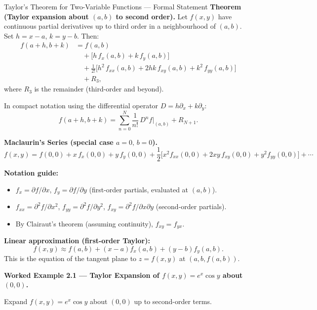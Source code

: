 \documentclass[12pt,a4paper]{article}
\begin{document}
\begin{infobox}{Taylor's Theorem for Two-Variable Functions --- Formal Statement}
\textbf{Theorem (Taylor expansion about \( (a,b) \) to second order).}
Let \( f(x,y) \) have continuous partial derivatives up to third order in a neighbourhood of \( (a,b) \). Set \( h = x-a \), \( k = y-b \). Then:
\begin{align*}
  f(a+h, b+k) &= f(a,b) \\
  &\quad + \bigl[h\,f_{x}(a,b) + k\,f_{y}(a,b)\bigr] \\
  &\quad + \frac{1}{2!}\bigl[h^{2}\,f_{xx}(a,b) + 2hk\,f_{xy}(a,b) + k^{2}\,f_{yy}(a,b)\bigr] \\
  &\quad + R_{3},
\end{align*}
where \( R_{3} \) is the remainder (third-order and beyond).

In compact notation using the differential operator \( D = h\partial_{x} + k\partial_{y} \):
\[
  f(a+h, b+k) = \sum_{n=0}^{N} \frac{1}{n!}\,D^{n}f\Big|_{(a,b)} + R_{N+1}.
\]

\textbf{Maclaurin's Series (special case \( a = 0,\, b = 0 \)).}
\[
  f(x,y) = f(0,0) + x\,f_{x}(0,0) + y\,f_{y}(0,0)
            + \frac{1}{2}\bigl[x^{2}f_{xx}(0,0) + 2xy\,f_{xy}(0,0) + y^{2}f_{yy}(0,0)\bigr] + \cdots
\]

\textbf{Notation guide:}
\begin{itemize}[leftmargin=*]
  \item \( f_{x} = \partial f/\partial x \), \( f_{y} = \partial f/\partial y \) (first-order partials, evaluated at \( (a,b) \)).
  \item \( f_{xx} = \partial^{2}f/\partial x^{2} \), \( f_{yy} = \partial^{2}f/\partial y^{2} \), \( f_{xy} = \partial^{2}f/\partial x\partial y \) (second-order partials).
  \item By Clairaut's theorem (assuming continuity), \( f_{xy} = f_{yx} \).
\end{itemize}

\textbf{Linear approximation (first-order Taylor):}
\[
  f(x,y) \approx f(a,b) + (x-a)f_{x}(a,b) + (y-b)f_{y}(a,b).
\]
This is the equation of the tangent plane to \( z = f(x,y) \) at \( (a,b,f(a,b)) \).
\end{infobox}

\noindent\textbf{Worked Example 2.1 --- Taylor Expansion of \( f(x,y) = e^{x}\cos y \) about \( (0,0) \).}

Expand \( f(x,y) = e^{x}\cos y \) about \( (0,0) \) up to second-order terms.
\end{document}
